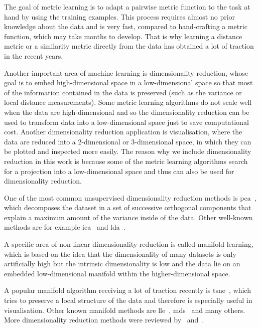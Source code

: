 The goal of metric learning is to adapt a pairwise metric function to the task at hand by using the training examples. This process requires almost no prior knowledge about the data and is very fast, compared to hand-crafting a metric function, which may take months to develop. That is why learning a distance metric or a similarity metric directly from the data has obtained a lot of traction in the recent years.

Another important area of machine learning is dimensionality reduction, whose goal is to embed high-dimensional space in a low-dimensional space so that most of the information contained in the data is preserved (such as the variance or local distance measurements). Some metric learning algorithms do not scale well when the data are high-dimensional and so the dimensionality reduction can be used to transform data into a low-dimensional space just to save computational cost. Another dimensionality reduction application is visualisation, where the data are reduced into a 2-dimensional or 3-dimensional space, in which they can be plotted and inspected more easily. The reason why we include dimensionality reduction in this work is because some of the metric learning algorithms search for a projection into a low-dimensional space and thus can also be used for dimensionality reduction.

One of the most common unsupervised dimensionality reduction methods is \ac{pca}~\citep{jolliffe1986principal}, which decomposes the dataset in a set of successive orthogonal components that explain a maximum amount of the variance inside of the data. Other well-known methods are for example \ac{ica}~\citep{comon1994independent} and \ac{lda}~\citep{fisher1936use}.

A specific area of non-linear dimensionality reduction is called manifold learning, which is based on the idea that the dimensionality of many datasets is only artificially high but the intrinsic dimensionality is low and the data lie on an embedded low-dimensional manifold within the higher-dimensional space.

A popular manifold algorithm receiving a lot of traction recently is \ac{tsne}~\citep{maaten2008visualizing}, which tries to preserve a local structure of the data and therefore is especially useful in visualisation. Other known manifold methods are \ac{lle}~\citep{roweis2000nonlinear}, \ac{mds}~\citep{kruskal1978multidimensional} and many others. More dimensionality reduction methods were reviewed by~\citep{fodor2002survey} and~\citep{van2009dimensionality}.

